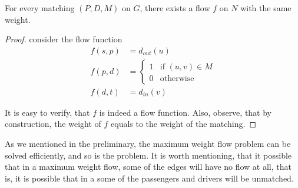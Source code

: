 \begin{lemma}
For every matching $(P, D, M)$ on $G$, there exists a flow $f$ on $N$ with the same weight. 
\end{lemma}

\begin{proof}
consider the flow function
\begin{align*}
f(s, p)		& = d_{out}(u)		 				\\
f(p, d)		& = 
				\begin{cases}
				1 & \text{if } (u, v) \in M		\\
				0 & \text{otherwise}
				\end{cases}						\\
f(d, t) 	& = d_{in}(v) 
\end{align*}

It is easy to verify, that $f$ is indeed a flow function.
Also, observe, that by construction,
the weight of $f$ equals to the weight of the matching.
\end{proof}

As we mentioned in the preliminary, 
the maximum weight flow problem can be solved efficiently, 
and so is the \FIXEDCARPOOL{} problem.
It is worth mentioning, that it possible that in a maximum weight flow, 
some of the edges will have no flow at all, 
that is, it is possible that in a \FIXEDCARPOOL{}
some of the passengers and drivers will be unmatched.  